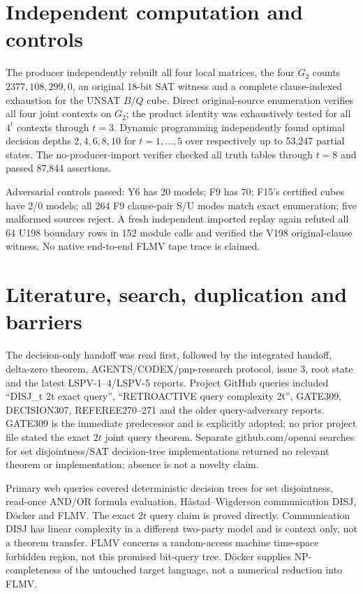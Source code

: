\documentclass[11pt]{article}
\begin{document}
\section{Independent computation and controls}
The producer independently rebuilt all four local matrices, the four $G_2$ counts
$2377,108,299,0$, an original 18-bit SAT witness and a complete clause-indexed
exhaustion for the UNSAT $B/Q$ cube.  Direct original-source enumeration verifies
all four joint contexts on $G_2$; the product identity was exhaustively tested for
all $4^t$ contexts through $t=3$.  Dynamic programming independently found optimal
decision depths $2,4,6,8,10$ for $t=1,\ldots,5$ over respectively up to 53,247
partial states.  The no-producer-import verifier checked all truth tables through
$t=8$ and passed 87,844 assertions.

Adversarial controls passed: Y6 has 20 models; F9 has 70; F15's certified cubes have
2/0 models; all 264 F9 clause-pair S/U modes match exact enumeration; five malformed
sources reject.  A fresh independent imported replay again refuted all 64 U198
boundary rows in 152 module calls and verified the V198 original-clause witness.
No native end-to-end FLMV tape trace is claimed.

\section{Literature, search, duplication and barriers}
The decision-only handoff was read first, followed by the integrated handoff,
delta-zero theorem, AGENTS/CODEX/pnp-research protocol, issue 3, root state and the
latest LSPV-1--4/LSPV-5 reports.  Project GitHub queries included
``DISJ\_t 2t exact query'', ``RETROACTIVE query complexity 2t'', GATE309,
DECISION307, REFEREE270--271 and the older query-adversary reports.  GATE309 is the
immediate predecessor and is explicitly adopted; no prior project file stated the
exact $2t$ joint query theorem.  Separate github.com/openai searches for set
disjointness/SAT decision-tree implementations returned no relevant theorem or
implementation; absence is not a novelty claim.

Primary web queries covered deterministic decision trees for set disjointness,
read-once AND/OR formula evaluation, H\r{a}stad--Wigderson communication DISJ,
D\"ocker and FLMV.  The exact $2t$ query claim is proved directly.  Communication
DISJ has linear complexity in a different two-party model and is context only, not
a theorem transfer.  FLMV concerns a random-access machine time-space forbidden
region, not this promised bit-query tree.  D\"ocker supplies NP-completeness of the
untouched target language, not a numerical reduction into FLMV.
\end{document}
